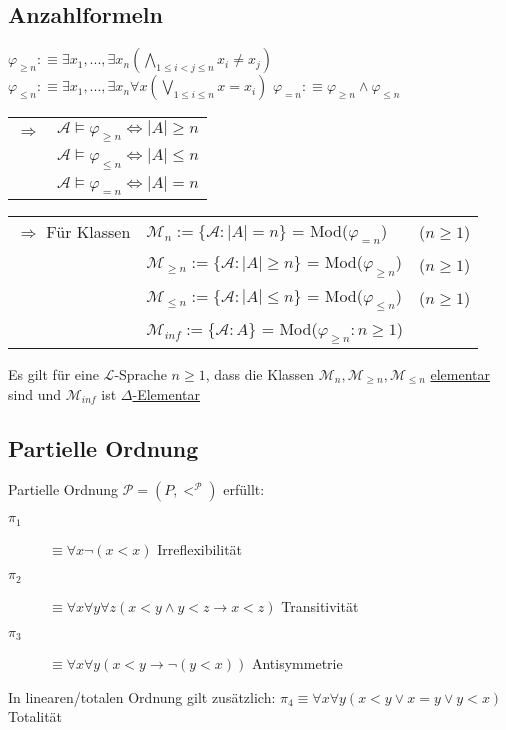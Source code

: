 \documentclass[12pt,a4paper]{article} %
\begin{document}
	\subsection{Anzahlformeln}
	$\varphi_{\ge n} :\equiv \exists x_1, ..., \exists x_n (\bigwedge\limits_{1 \le i < j \le n} x_i \ne x_j)$ \newline
	$\varphi_{\le n} :\equiv \exists x_1, ..., \exists x_n \forall x (\bigvee\limits_{1 \le i \le n} x = x_i)$ \newline
	$\varphi_{= n} :\equiv \varphi_{\ge n} \land \varphi_{\le n}$
	
	\begin{tabular}{l l}
		$\Rightarrow$ & $\mathcal{A} \hyperref[Erfullbar]{\vDash} \varphi_{\ge n} \Leftrightarrow |A| \ge n$ \\
		& $\mathcal{A} \hyperref[Erfullbar]{\vDash} \varphi_{\le n} \Leftrightarrow |A| \le n$ \\
		& $\mathcal{A} \hyperref[Erfullbar]{\vDash} \varphi_{= n} \Leftrightarrow |A| = n$
	\end{tabular}

	\begin{tabular}{l l l}
		$\Rightarrow$ Für Klassen & $\mathcal{M}_n := \{\mathcal{A} : |A| = n\}$ = Mod($\varphi_{= n}$) & ($n \ge 1$) \\
		& $\mathcal{M}_{\ge n} := \{\mathcal{A} : |A| \ge n \}$ = Mod($\varphi_{\ge n}$) & ($n \ge 1$) \\
		& $\mathcal{M}_{\le n} := \{\mathcal{A} : |A| \le n\}$ = Mod($\varphi_{\le n}$) & ($n \ge 1$) \\
		& $\mathcal{M}_{inf} := \{\mathcal{A} : A\}$ = Mod($\varphi_{\ge n} : n \ge 1$) & \\
	\end{tabular}

	Es gilt für eine $\mathcal{L}$-Sprache $n \ge 1$, dass die Klassen $\mathcal{M}_n, \mathcal{M}_{\ge n}, \mathcal{M}_{\le n}$ \hyperref[Elementar]{elementar} sind und $\mathcal{M}_{inf}$ ist \hyperref[Elementar]{$\Delta$-Elementar}
	
	\subsection{Partielle Ordnung}
	Partielle Ordnung $\mathcal{P} = (P, <^{\mathcal{P}})$ erfüllt:
	\begin{description}
		\item[$\pi_1$] $\equiv \forall x \neg(x < x)$ Irreflexibilität
		\item[$\pi_2$] $\equiv \forall x \forall y \forall z (x < y \land y < z \rightarrow x < z)$ Transitivität
		\item[$\pi_3$] $\equiv \forall x \forall y (x < y \rightarrow \neg (y < x))$ Antisymmetrie
	\end{description}
	In linearen/totalen Ordnung gilt zusätzlich:\newline
	$\pi_4 \equiv \forall x \forall y (x < y \lor x = y \lor y < x)$ Totalität
	
\end{document}
